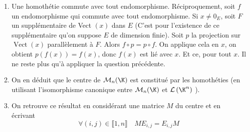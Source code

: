 \begin{enumerate}
\item Une homothétie commute avec tout endomorphisme. Réciproquement, soit $f$ un endomorphisme qui commute avec tout endomorphisme. Si $x \neq 0_E$, soit $F$ un supplémentaire de Vect $(x)$ dans $E$ (C'est pour l'existence de ce supplémentaire qu'on suppose $E$ de dimension finie). Soit $p$ la projection sur $\operatorname{Vect}(x)$ parallèlement à $F$. Alors $f \circ p=p \circ f$. On applique cela en $x$, on obtient $p(f(x))=f(x)$, donc $f(x)$ est lié avec $x$. Et ce, pour tout $x$. Il ne reste plus qu'à appliquer la question précédente.
\item On en déduit que le centre de $\mathcal{M}_n(\K)$ est constitué par les homothéties (en utilisant l'isomorphisme canonique entre $\mathcal{M}_n(\K)$ et $\mathcal{L}\left(\K^n\right)$ ).
\item On retrouve ce résultat en considérant une matrice $M$ du centre et en écrivant
$$
\forall(i, j) \in \llbracket 1, n \rrbracket \quad M E_{i, j}=E_{i, j} M
$$
\end{enumerate}
